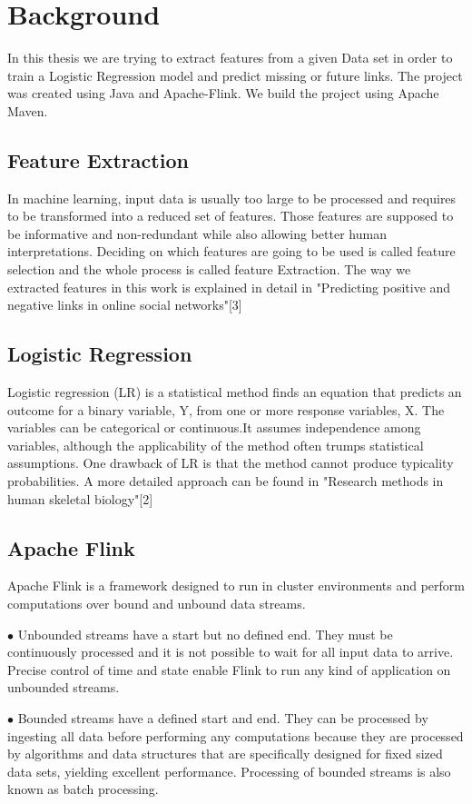 
\chapter{Background}

In this thesis we are trying to extract features from a given Data set in order to train a Logistic Regression model and predict missing or future links.
The project was created using Java and Apache-Flink. We build the project using Apache Maven. 
 





\section{Feature Extraction}
In machine learning, input data is usually too large to be processed and requires to be transformed into a reduced set of features. Those features are supposed to be informative and non-redundant while also allowing better human interpretations. Deciding on which features are going to be used is called feature selection and the whole process is called feature Extraction. The way we extracted features in this work is explained in detail in "Predicting positive and negative links in online social networks"[3] 
\section{Logistic Regression}
Logistic regression (LR) is a statistical method finds an equation that predicts an outcome for a binary variable, Y, from one or more response variables, X. The variables can be categorical or continuous.It assumes independence among variables, although the applicability of the method often trumps statistical assumptions. One drawback of LR is that the method cannot produce typicality probabilities. A more detailed approach can be found in "Research methods in human skeletal biology"[2]

\section{Apache Flink}

Apache Flink is a framework designed to run in cluster environments and perform computations over bound and unbound data streams. 
    \begin{description}
    \item $\bullet$ Unbounded streams have a start but no defined end. They must be continuously processed and it is not possible to wait for all input data to arrive.
    Precise control of time and state enable Flink to run any kind of application on unbounded streams. 

    \item $\bullet$ Bounded streams have a defined start and end. They can be processed by ingesting all data before performing any computations because they are processed by algorithms and data structures that are specifically designed for fixed sized data sets, yielding excellent performance.
    Processing of bounded streams is also known as batch processing.
    \end{description}
    
